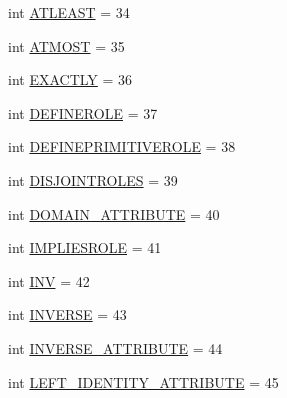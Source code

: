 \begin{DoxyCompactItemize}
\item 
int \hyperlink{interfacede_1_1uulm_1_1ecs_1_1ai_1_1owlapi_1_1krssparser_1_1_k_r_s_s2_parser_constants_a4c12bd24ee4a9be00801dd44a46509d8}{A\-T\-L\-E\-A\-S\-T} = 34
\item 
int \hyperlink{interfacede_1_1uulm_1_1ecs_1_1ai_1_1owlapi_1_1krssparser_1_1_k_r_s_s2_parser_constants_afb1c9df16c9faae09c39c737bcae5565}{A\-T\-M\-O\-S\-T} = 35
\item 
int \hyperlink{interfacede_1_1uulm_1_1ecs_1_1ai_1_1owlapi_1_1krssparser_1_1_k_r_s_s2_parser_constants_a65e34fb00ac18d17c8f1efcb07a5aeaf}{E\-X\-A\-C\-T\-L\-Y} = 36
\item 
int \hyperlink{interfacede_1_1uulm_1_1ecs_1_1ai_1_1owlapi_1_1krssparser_1_1_k_r_s_s2_parser_constants_a6e7a0d30f4946f6856a79461fe6f969e}{D\-E\-F\-I\-N\-E\-R\-O\-L\-E} = 37
\item 
int \hyperlink{interfacede_1_1uulm_1_1ecs_1_1ai_1_1owlapi_1_1krssparser_1_1_k_r_s_s2_parser_constants_a0d391fd5f0e0e857635dcc8e3f9818f8}{D\-E\-F\-I\-N\-E\-P\-R\-I\-M\-I\-T\-I\-V\-E\-R\-O\-L\-E} = 38
\item 
int \hyperlink{interfacede_1_1uulm_1_1ecs_1_1ai_1_1owlapi_1_1krssparser_1_1_k_r_s_s2_parser_constants_ab598ad8a0b348a11ff78aeee8b16e051}{D\-I\-S\-J\-O\-I\-N\-T\-R\-O\-L\-E\-S} = 39
\item 
int \hyperlink{interfacede_1_1uulm_1_1ecs_1_1ai_1_1owlapi_1_1krssparser_1_1_k_r_s_s2_parser_constants_ab7f7d39bab1326bae8346fca92d42bce}{D\-O\-M\-A\-I\-N\-\_\-\-A\-T\-T\-R\-I\-B\-U\-T\-E} = 40
\item 
int \hyperlink{interfacede_1_1uulm_1_1ecs_1_1ai_1_1owlapi_1_1krssparser_1_1_k_r_s_s2_parser_constants_a841519b4685e556735273ab650c798ce}{I\-M\-P\-L\-I\-E\-S\-R\-O\-L\-E} = 41
\item 
int \hyperlink{interfacede_1_1uulm_1_1ecs_1_1ai_1_1owlapi_1_1krssparser_1_1_k_r_s_s2_parser_constants_ada4f928da476a870684b0437ee75c43e}{I\-N\-V} = 42
\item 
int \hyperlink{interfacede_1_1uulm_1_1ecs_1_1ai_1_1owlapi_1_1krssparser_1_1_k_r_s_s2_parser_constants_af2fc4e8d5a6fcc7422bbc862829a975b}{I\-N\-V\-E\-R\-S\-E} = 43
\item 
int \hyperlink{interfacede_1_1uulm_1_1ecs_1_1ai_1_1owlapi_1_1krssparser_1_1_k_r_s_s2_parser_constants_a04377b4f8ff83c1664ebd874883367e3}{I\-N\-V\-E\-R\-S\-E\-\_\-\-A\-T\-T\-R\-I\-B\-U\-T\-E} = 44
\item 
int \hyperlink{interfacede_1_1uulm_1_1ecs_1_1ai_1_1owlapi_1_1krssparser_1_1_k_r_s_s2_parser_constants_a0ba126dfaa86f5a9d6b3a6b37286a652}{L\-E\-F\-T\-\_\-\-I\-D\-E\-N\-T\-I\-T\-Y\-\_\-\-A\-T\-T\-R\-I\-B\-U\-T\-E} = 45

\end{DoxyCompactItemize}
